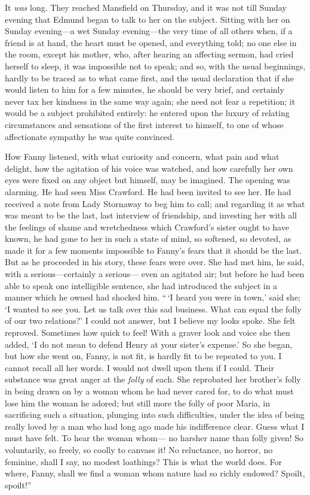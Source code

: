 It \emph{was} long.  They reached Mansfield on Thursday,
and it was not till Sunday evening that Edmund began
to talk to her on the subject.  Sitting with her on
Sunday evening---a wet Sunday evening---the very time of
all others when, if a friend is at hand, the heart must
be opened, and everything told; no one else in the room,
except his mother, who, after hearing an affecting sermon,
had cried herself to sleep, it was impossible not to speak;
and so, with the usual beginnings, hardly to be traced
as to what came first, and the usual declaration that
if she would listen to him for a few minutes, he should
be very brief, and certainly never tax her kindness
in the same way again; she need not fear a repetition;
it would be a subject prohibited entirely:  he entered
upon the luxury of relating circumstances and sensations
of the first interest to himself, to one of whose
affectionate sympathy he was quite convinced.

How Fanny listened, with what curiosity and concern,
what pain and what delight, how the agitation of his
voice was watched, and how carefully her own eyes were
fixed on any object but himself, may be imagined.
The opening was alarming.  He had seen Miss Crawford.
He had been invited to see her.  He had received a note
from Lady Stornaway to beg him to call; and regarding
it as what was meant to be the last, last interview
of friendship, and investing her with all the feelings
of shame and wretchedness which Crawford's sister ought
to have known, he had gone to her in such a state of mind,
so softened, so devoted, as made it for a few moments
impossible to Fanny's fears that it should be the last.
But as he proceeded in his story, these fears were over.
She had met him, he said, with a serious---certainly a serious---%
even an agitated air; but before he had been able
to speak one intelligible sentence, she had introduced
the subject in a manner which he owned had shocked him.
``\,`I heard you were in town,' said she; `I wanted to see you.
Let us talk over this sad business.  What can equal the folly
of our two relations?'  I could not answer, but I believe
my looks spoke.  She felt reproved.  Sometimes how quick
to feel!  With a graver look and voice she then added,
`I do not mean to defend Henry at your sister's expense.'
So she began, but how she went on, Fanny, is not fit,
is hardly fit to be repeated to you.  I cannot recall
all her words.  I would not dwell upon them if I could.
Their substance was great anger at the \emph{folly} of each.
She reprobated her brother's folly in being drawn on
by a woman whom he had never cared for, to do what must
lose him the woman he adored; but still more the folly of
poor Maria, in sacrificing such a situation, plunging into
such difficulties, under the idea of being really loved
by a man who had long ago made his indifference clear.
Guess what I must have felt.  To hear the woman whom---%
no harsher name than folly given!  So voluntarily,
so freely, so coolly to canvass it!  No reluctance,
no horror, no feminine, shall I say, no modest loathings?
This is what the world does.  For where, Fanny, shall we
find a woman whom nature had so richly endowed?  Spoilt,
spoilt!''

